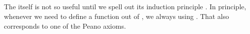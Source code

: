 \begin{code}%
\>[0]\AgdaSpace{}%
\AgdaSpace{}%
\AgdaSymbol{:}\AgdaSpace{}%
\AgdaSpace{}%
\<%
\\
\>[0][@{}l@{\AgdaIndent{0}}]%
\>[2]\AgdaSpace{}%
\AgdaSymbol{:}\AgdaSpace{}%
\<%
\\
%
\>[2]\AgdaSpace{}%
\AgdaSymbol{:}\AgdaSpace{}%
\AgdaSpace{}%
\AgdaSpace{}%
\<%
\\
\>[0]\AgdaSymbol{\{-\#}\AgdaSpace{}%
\AgdaSpace{}%
\AgdaSpace{}%
\AgdaSpace{}%
\AgdaSymbol{\#-\}}\<%
\\
%
\\[\AgdaEmptyExtraSkip]%
\>[0]\AgdaFunction{\AgdaUnderscore{}}\AgdaSpace{}%
\AgdaSymbol{:}\AgdaSpace{}%
\AgdaSpace{}%
\AgdaSpace{}%
\<%
\\
\>[0]\AgdaSymbol{\AgdaUnderscore{}}\AgdaSpace{}%
\AgdaSymbol{=}\AgdaSpace{}%
\AgdaSpace{}%
\<%
\\
%
\\[\AgdaEmptyExtraSkip]%
\>[0]\AgdaFunction{\AgdaUnderscore{}}\AgdaSpace{}%
\AgdaSymbol{:}\AgdaSpace{}%
\AgdaSpace{}%
\AgdaSpace{}%
\<%
\\
\>[0]\AgdaSymbol{\AgdaUnderscore{}}\AgdaSpace{}%
\AgdaSymbol{=}\AgdaSpace{}%
\AgdaSpace{}%
\AgdaOperator{\AgdaInductiveConstructor{,}}\AgdaSpace{}%
\<%
\end{code}

 The  itself is not so useful until we spell out its induction principle . In principle, whenever we need to define a function out of , we always using . That also corresponds to one of the Peano axioms.


